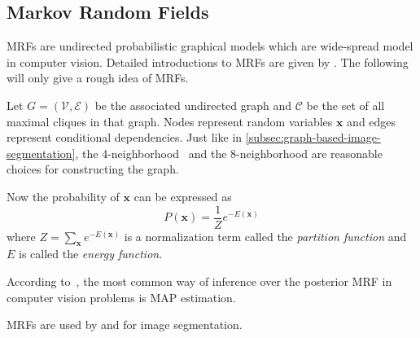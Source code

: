 
\subsection{Markov Random Fields}\label{subsec:markov-random-fields}
\Glspl{MRF} are undirected probabilistic graphical models which are wide-spread
model in computer vision. Detailed introductions to \glspl{MRF} are given by
\cite{blake2011markov,murphy2012machine}. The following will only give a rough
idea of \glspl{MRF}.

Let $G=(\mathcal{V}, \mathcal{E})$ be the associated undirected graph and
$\mathcal{C}$ be the set of all maximal cliques in that graph. Nodes represent
random variables $\mathbf{x}$ and edges represent conditional dependencies.
Just like in \cref{subsec:graph-based-image-segmentation}, the
4-neighborhood~\cite{shotton2006textonboost} and the 8-neighborhood are
reasonable choices for constructing the graph.

Now the probability of $\mathbf{x}$ can be expressed as
\[P(\mathbf{x}) = \frac{1}{Z} e^{-E(\mathbf{x})}\]
where $Z = \sum_{\mathbf{x}} e^{-E(\mathbf{x})}$ is a normalization term called
the \textit{partition function} and $E$ is called the \textit{energy function}.

According to~\cite{murphy2012machine}, the most common way of inference over
the posterior \gls{MRF} in computer vision problems is \gls{MAP} estimation.




\glspl{MRF} are used by \cite{zhang2001segmentation} and \cite{moser2012markov}
for image segmentation.






